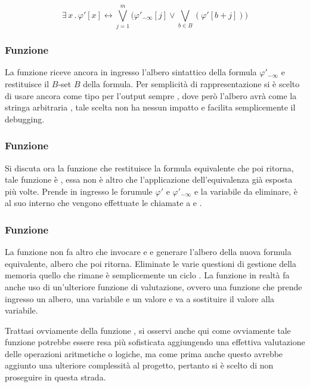 \documentclass[11pt,letterpaper,twoside]{article}
\begin{document}
$$ \exists \, x \, . \, \varphi'[x] \longleftrightarrow \bigvee_{j=1}^m \Big(
\varphi'_{- \infty}[j] \lor \bigvee_{b \in B}(\varphi'[b+j]) \Big)$$

\subsubsection{Funzione } 

La funzione 
riceve ancora in ingresso l'albero sintattico della formula $\varphi'_{-
\infty}$ e restituisce il $B$-set $B$ della formula. Per semplicità di
rappresentazione si è scelto di usare ancora come tipo per l'output sempre
, dove però l'albero avrà come  la
stringa arbitraria , tale scelta non ha nessun impatto e
facilita semplicemente il debugging.

\subsubsection{Funzione } 

Si discuta ora la funzione che restituisce la formula equivalente che poi
 ritorna, tale funzione è , essa non è altro
che l'applicazione dell'equivalenza già esposta più volte. Prende in ingresso le
forumule $\varphi'$ e $\varphi'_{-\infty}$ e la variabile da eliminare, è al suo
interno che vengono effettuate le chiamate a  e
.

\subsubsection{Funzione } 

La funzione  non fa altro che invocare  e
 e generare l'albero della nuova formula equivalente,
albero che poi ritorna. Eliminate le varie questioni di gestione della memoria
quello che rimane è semplicemente un ciclo . La funzione in realtà
fa anche uso di un'ulteriore funzione di valutazione, ovvero una funzione che
prende ingresso un albero, una variabile e un valore e va a sostituire il valore
alla variabile.

Trattasi ovviamente della funzione , si osservi anche qui come ovviamente tale funzione
potrebbe essere resa più sofisticata aggiungendo una effettiva valutazione delle
operazioni aritmetiche o logiche, ma come prima anche questo avrebbe aggiunto
una ulteriore complessità al progetto, pertanto si è scelto di non proseguire in
questa strada.
\end{document}
